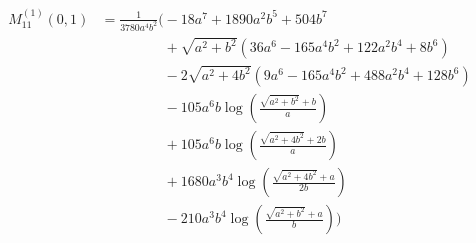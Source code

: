 \begin{align*}
M^{(1)}_{11}(0,1) &= \frac{1}{3780 a^{4} b^{2}}\Bigg(- 18 a^{7} + 1890 a^{2} b^{5} + 504 b^{7}\\
&\phantom{{}=\frac{1}{3780 a^{4} b^{2}}\Bigg(}+ \sqrt{a^{2} + b^{2}}\left(36 a^{6} - 165 a^{4} b^{2} + 122 a^{2} b^{4} + 8 b^{6}\right)\\
&\phantom{{}=\frac{1}{3780 a^{4} b^{2}}\Bigg(}- 2 \sqrt{a^{2} + 4 b^{2}}\left(9 a^{6} - 165 a^{4} b^{2} + 488 a^{2} b^{4} + 128 b^{6}\right)\\
&\phantom{{}=\frac{1}{3780 a^{4} b^{2}}\Bigg(}- 105 a^{6} b \log\left(\frac{\sqrt{a^{2} + b^{2}} + b}{a}\right)\\
&\phantom{{}=\frac{1}{3780 a^{4} b^{2}}\Bigg(}+ 105 a^{6} b \log\left(\frac{\sqrt{a^{2} + 4 b^{2}} + 2 b}{a}\right)\\
&\phantom{{}=\frac{1}{3780 a^{4} b^{2}}\Bigg(}+ 1680 a^{3} b^{4} \log\left(\frac{\sqrt{a^{2} + 4 b^{2}} + a}{2 b}\right)\\
&\phantom{{}=\frac{1}{3780 a^{4} b^{2}}\Bigg(}- 210 a^{3} b^{4} \log\left(\frac{\sqrt{a^{2} + b^{2}} + a}{b}\right)\Bigg)
\end{align*}
